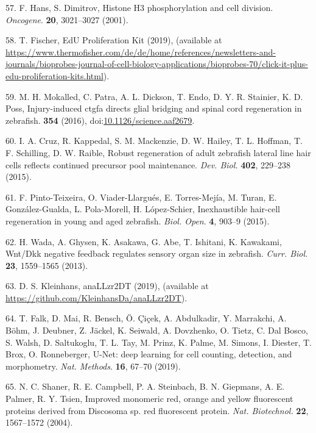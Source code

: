 \documentclass[11pt,singlespacinge,twoside]{reedthesis} %
\begin{document}
\leavevmode\hypertarget{ref-Hans2001}{}%
57. F. Hans, S. Dimitrov, Histone H3 phosphorylation and cell division. \emph{Oncogene}. \textbf{20}, 3021--3027 (2001).

\leavevmode\hypertarget{ref-Fischer}{}%
58. T. Fischer, EdU Proliferation Kit (2019), (available at \url{https://www.thermofisher.com/de/de/home/references/newsletters-and-journals/bioprobes-journal-of-cell-biology-applications/bioprobes-70/click-it-plus-edu-proliferation-kits.html}).

\leavevmode\hypertarget{ref-Mokalled2016}{}%
59. M. H. Mokalled, C. Patra, A. L. Dickson, T. Endo, D. Y. R. Stainier, K. D. Poss, Injury-induced ctgfa directs glial bridging and spinal cord regeneration in zebrafish. \textbf{354} (2016), doi:\href{https://doi.org/10.1126/science.aaf2679}{10.1126/science.aaf2679}.

\leavevmode\hypertarget{ref-Cruz2015}{}%
60. I. A. Cruz, R. Kappedal, S. M. Mackenzie, D. W. Hailey, T. L. Hoffman, T. F. Schilling, D. W. Raible, Robust regeneration of adult zebrafish lateral line hair cells reflects continued precursor pool maintenance. \emph{Dev. Biol.} \textbf{402}, 229--238 (2015).

\leavevmode\hypertarget{ref-Pinto-Teixeira2015}{}%
61. F. Pinto-Teixeira, O. Viader-Llargués, E. Torres-Mejía, M. Turan, E. González-Gualda, L. Pola-Morell, H. López-Schier, Inexhaustible hair-cell regeneration in young and aged zebrafish. \emph{Biol. Open}. \textbf{4}, 903--9 (2015).

\leavevmode\hypertarget{ref-Wada2013}{}%
62. H. Wada, A. Ghysen, K. Asakawa, G. Abe, T. Ishitani, K. Kawakami, Wnt/Dkk negative feedback regulates sensory organ size in zebrafish. \emph{Curr. Biol.} \textbf{23}, 1559--1565 (2013).

\leavevmode\hypertarget{ref-Kleinhansa}{}%
63. D. S. Kleinhans, anaLLzr2DT (2019), (available at \url{https://github.com/KleinhansDa/anaLLzr2DT}).

\leavevmode\hypertarget{ref-Falk2019}{}%
64. T. Falk, D. Mai, R. Bensch, Ö. Çiçek, A. Abdulkadir, Y. Marrakchi, A. Böhm, J. Deubner, Z. Jäckel, K. Seiwald, A. Dovzhenko, O. Tietz, C. Dal Bosco, S. Walsh, D. Saltukoglu, T. L. Tay, M. Prinz, K. Palme, M. Simons, I. Diester, T. Brox, O. Ronneberger, U-Net: deep learning for cell counting, detection, and morphometry. \emph{Nat. Methods}. \textbf{16}, 67--70 (2019).

\leavevmode\hypertarget{ref-Shaner2004}{}%
65. N. C. Shaner, R. E. Campbell, P. A. Steinbach, B. N. Giepmans, A. E. Palmer, R. Y. Tsien, Improved monomeric red, orange and yellow fluorescent proteins derived from Discosoma sp. red fluorescent protein. \emph{Nat. Biotechnol.} \textbf{22}, 1567--1572 (2004).
\end{document}
